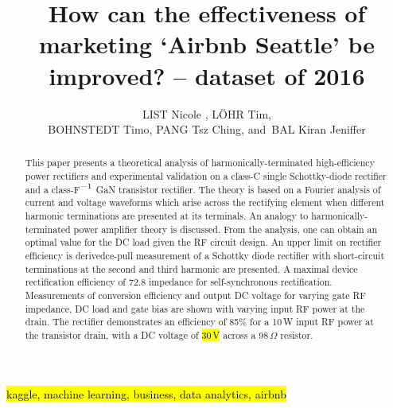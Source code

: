 \documentclass[journal]{IEEEtran}
\begin{document}
    \title{How can the effectiveness of marketing ‘Airbnb Seattle’ be improved?
– dataset of 2016 
}
  \author{LIST Nicole ,
      L\"OHR Tim,\\
      BOHNSTEDT Timo,
      PANG Tsz Ching,
      and~BAL Kiran Jeniffer%
}



\maketitle



\begin{abstract}
This paper presents a theoretical analysis of harmonically-terminated high-efficiency power rectifiers and experimental validation on a class-C single Schottky-diode rectifier and a class-F$^{\rm -1}$ GaN transistor rectifier. The theory is based on a Fourier analysis of current and voltage waveforms which arise across the rectifying element when different harmonic terminations are presented at its terminals. An analogy to harmonically-terminated power amplifier theory is discussed. From the analysis, one can obtain an optimal value for the DC load given the RF circuit design. An upper limit on rectifier efficiency is derivedce-pull measurement of a Schottky diode rectifier with short-circuit terminations at the second and third harmonic are presented. A maximal device rectification efficiency of 72.8 impedance for self-synchronous rectification. Measurements of conversion efficiency and output DC voltage for varying gate RF impedance, DC load and gate bias are shown with varying input RF power at the drain. The rectifier demonstrates an efficiency of 85\% for a 10\,W input RF power at the transistor drain, with a DC voltage of \hl{30\,V} across a 98\,$\Omega$ resistor.
\end{abstract}

\begin{IEEEkeywords}
\hl{kaggle, machine learning, business, data analytics, airbnb}
\end{IEEEkeywords}

\IEEEpeerreviewmaketitle


\end{document}
